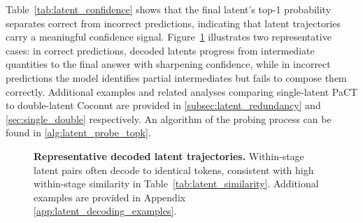 Table~\ref{tab:latent_confidence} shows that the final latent’s top-1 probability separates correct from incorrect predictions, indicating that latent trajectories carry a meaningful confidence signal. Figure~\ref{fig:latent_examples} illustrates two representative cases: in correct predictions, decoded latents progress from intermediate quantities to the final answer with sharpening confidence, while in incorrect predictions the model identifies partial intermediates but fails to compose them correctly. Additional examples and related analyses comparing single-latent PaCT to double-latent Coconut are provided in \ref{subsec:latent_redundancy} and \ref{sec:single_double} respectively. An algorithm of the probing process can be found in \ref{alg:latent_probe_topk}.
\begin{figure}[t]
\centering
{}



\caption{\textbf{Representative decoded latent trajectories.} Within-stage latent pairs often decode to identical tokens,
consistent with high within-stage similarity in Table~\ref{tab:latent_similarity}. Additional examples are provided in
Appendix~ \ref{app:latent_decoding_examples}.}
\label{fig:latent_examples}
\end{figure}

